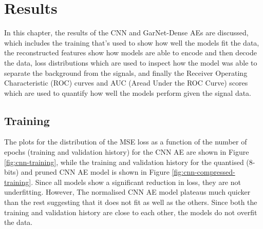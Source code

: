 \documentclass[a4paper]{article}
\theoremstyle{plain}
\theoremstyle{definition}
\begin{document}
	
	\section{Results}
	\label{section:results}

		In this chapter, the results of the CNN and GarNet-Dense AEs are discussed, which includes the training that's used to show how well the models fit the data, the reconstructed features show how models are able to encode and then decode the data, loss distributions which are used to inspect how the model was able to separate the background from the signals, and finally the Receiver Operating Characteristic (ROC) curves and AUC (Aread Under the ROC Curve) scores which are used to quantify how well the models perform given the signal data.

		\subsection{Training}
			
			The plots for the distribution of the MSE loss as a function of the number of epochs (training and validation history) for the CNN AE are shown in Figure \ref{fig:cnn-training}, while the training and validation history for the quantised (8-bits) and pruned CNN AE model is shown in Figure \ref{fig:cnn-compressed-training}. Since all models show a significant reduction in loss, they are not underfitting. However, The normalised CNN AE model plateaus much quicker than the rest suggesting that it does not fit as well as the others. Since both the training and validation history are close to each other, the models do not overfit the data.
\end{document}
